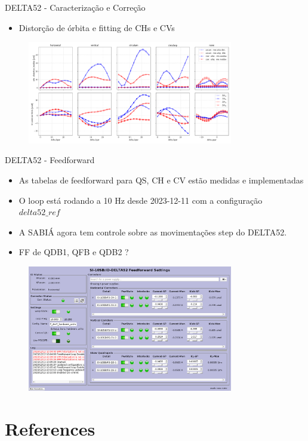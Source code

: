 \documentclass{beamer}					  %
\begin{document}
\begin{frame}{DELTA52 - Caracterização e Correção}
    \begin{itemize}
    		\item Distorção de órbita e fitting de CHs e CVs
    \end{itemize}
    \begin{figure}[H]
        	\centering
            \includegraphics[width=0.8\textwidth]{2023-12-12/figures/cod-fit.png}
            \label{fig:bba}
    \end{figure} 
\end{frame}

\begin{frame}{DELTA52 - Feedforward}
    \scriptsize{\begin{itemize}
    		\item As tabelas de feedforward para QS, CH e CV estão medidas e implementadas
            \item O loop está rodando a 10 Hz desde 2023-12-11 com a configuração $delta52\_ref$
            \item A SABIÁ agora tem controle sobre as movimentações step do DELTA52.
            \item FF de QDB1, QFB e QDB2 ?
    \end{itemize}}
    \begin{figure}[H]
        	\centering
            \includegraphics[width=0.8\textwidth]{2023-12-12/figures/idff.png}
            \label{fig:bba}
    \end{figure} 
\end{frame}


\section{References}
\end{document}
